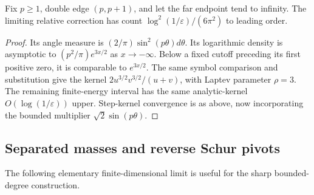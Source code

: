 \begin{corollary}
Fix $p\ge1$, double edge $(p,p+1)$, and let the far endpoint tend to
infinity. The limiting relative correction has count
$\log^2(1/\varepsilon)/(6\pi^2)$ to leading order.
\end{corollary}
\begin{proof}
Its angle measure is $(2/\pi)\sin^2(p\theta)d\theta$.
Its logarithmic density is asymptotic to
$(p^2/\pi)e^{3x/2}$ as $x\to-\infty$.
Below a fixed cutoff preceding its first positive zero, it is comparable
to $e^{3x/2}$. The same symbol comparison and substitution give the
kernel $2u^{3/2}v^{3/2}/(u+v)$, with Laptev parameter $\rho=3$.
The remaining finite-energy interval has the same analytic-kernel
$O(\log(1/\varepsilon))$ upper. Step-kernel convergence is as above,
now incorporating the bounded multiplier $\sqrt2\sin(p\theta)$.
\end{proof}

\subsection{Separated masses and reverse Schur pivots}
The following elementary finite-dimensional limit is useful for the
sharp bounded-degree construction.

